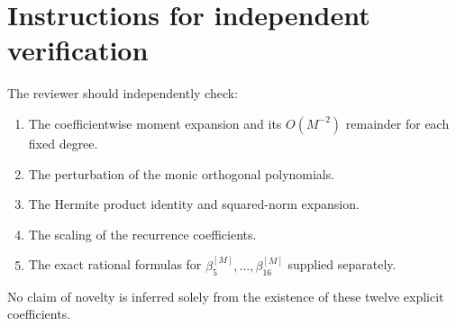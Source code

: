 \documentclass[10pt]{amsart}
\begin{document}
\section*{Instructions for independent verification}

The reviewer should independently check:

\begin{enumerate}
\item The coefficientwise moment expansion and its
      $O(M^{-2})$ remainder for each fixed degree.
\item The perturbation of the monic orthogonal polynomials.
\item The Hermite product identity and squared-norm expansion.
\item The scaling of the recurrence coefficients.
\item The exact rational formulas for
      $\beta_5^{[M]},\ldots,\beta_{16}^{[M]}$
      supplied separately.
\end{enumerate}

No claim of novelty is inferred solely from the
existence of these twelve explicit coefficients.
\end{document}
